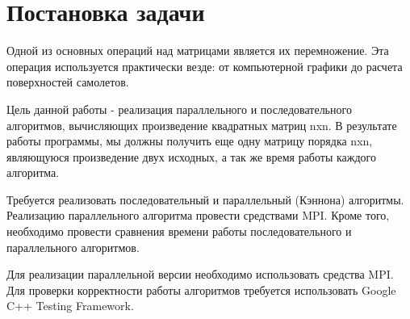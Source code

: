 \documentclass{report}
\begin{document}
\section*{Постановка задачи}
Одной из основных операций над матрицами является их перемножение. Эта операция используется практически везде: от компьютерной графики до расчета поверхностей самолетов.
\par Цель данной работы - реализация параллельного и последовательного алгоритмов, вычисляющих произведение квадратных матриц nxn. В результате работы программы, мы должны получить еще одну матрицу порядка nxn, являющуюся произведение двух исходных, а так же время работы каждого алгоритма.
\par Требуется реализовать последовательный и параллельный (Кэннона) алгоритмы. Реализацию параллельного алгоритма провести средствами MPI. Кроме того, необходимо провести сравнения времени работы последовательного и параллельного алгоритмов.
\par Для реализации параллельной версии необходимо использовать средства MPI. Для проверки корректности работы алгоритмов требуется использовать Google C++ Testing Framework.
\newpage

\end{document}
